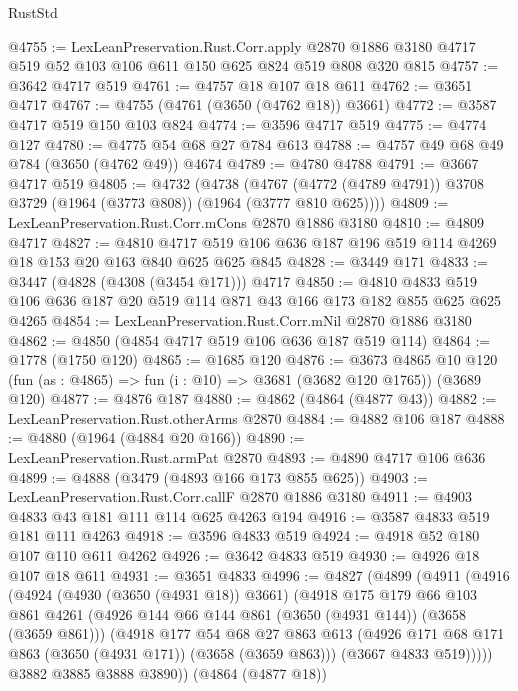 \begin{lexlean}{RustStd}
\begin{coremodule}
@4755 := LexLeanPreservation.Rust.Corr.apply
    @2870
    @1886
    @3180
    @4717
    @519
    @52
    @103
    @106
    @611
    @150
    @625
    @824
    @519
    @808
    @320
    @815
@4757 := @3642 @4717 @519
@4761 := @4757 @18 @107 @18 @611
@4762 := @3651 @4717
@4767 := @4755 (@4761 (@3650 (@4762 @18)) @3661)
@4772 := @3587 @4717 @519 @150 @103 @824
@4774 := @3596 @4717 @519
@4775 := @4774 @127
@4780 := @4775 @54 @68 @27 @784 @613
@4788 := @4757 @49 @68 @49 @784 (@3650 (@4762 @49)) @4674
@4789 := @4780 @4788
@4791 := @3667 @4717 @519
@4805 := @4732
    (@4738 (@4767 (@4772 (@4789 @4791)) @3708 @3729 (@1964 (@3773 @808)) (@1964 (@3777 @810 @625))))
@4809 := LexLeanPreservation.Rust.Corr.mCons @2870 @1886 @3180
@4810 := @4809 @4717
@4827 := @4810 @4717 @519 @106 @636 @187 @196 @519 @114 @4269 @18 @153 @20 @163 @840 @625 @625 @845
@4828 := @3449 @171
@4833 := @3447 (@4828 (@4308 (@3454 @171))) @4717
@4850 := @4810 @4833 @519 @106 @636 @187 @20 @519 @114 @871 @43 @166 @173 @182 @855 @625 @625 @4265
@4854 := LexLeanPreservation.Rust.Corr.mNil @2870 @1886 @3180
@4862 := @4850 (@4854 @4717 @519 @106 @636 @187 @519 @114)
@4864 := @1778 (@1750 @120)
@4865 := @1685 @120
@4876 := @3673
    @4865
    @10
    @120
    (fun (as : @4865) => fun (i : @10) => @3681 (@3682 @120 @1765))
    (@3689 @120)
@4877 := @4876 @187
@4880 := @4862 (@4864 (@4877 @43))
@4882 := LexLeanPreservation.Rust.otherArms @2870
@4884 := @4882 @106 @187
@4888 := @4880 (@1964 (@4884 @20 @166))
@4890 := LexLeanPreservation.Rust.armPat @2870
@4893 := @4890 @4717 @106 @636
@4899 := @4888 (@3479 (@4893 @166 @173 @855 @625))
@4903 := LexLeanPreservation.Rust.Corr.callF @2870 @1886 @3180
@4911 := @4903 @4833 @43 @181 @111 @114 @625 @4263 @194
@4916 := @3587 @4833 @519 @181 @111 @4263
@4918 := @3596 @4833 @519
@4924 := @4918 @52 @180 @107 @110 @611 @4262
@4926 := @3642 @4833 @519
@4930 := @4926 @18 @107 @18 @611
@4931 := @3651 @4833
@4996 := @4827
    (@4899
      (@4911
        (@4916
          (@4924
            (@4930 (@3650 (@4931 @18)) @3661)
            (@4918
              @175
              @179
              @66
              @103
              @861
              @4261
              (@4926 @144 @66 @144 @861 (@3650 (@4931 @144)) (@3658 (@3659 @861)))
              (@4918
                @177
                @54
                @68
                @27
                @863
                @613
                (@4926 @171 @68 @171 @863 (@3650 (@4931 @171)) (@3658 (@3659 @863)))
                (@3667 @4833 @519)))))
        @3882
        @3885
        @3888
        @3890))
    (@4864 (@4877 @18))

\end{coremodule}
\end{lexlean}
